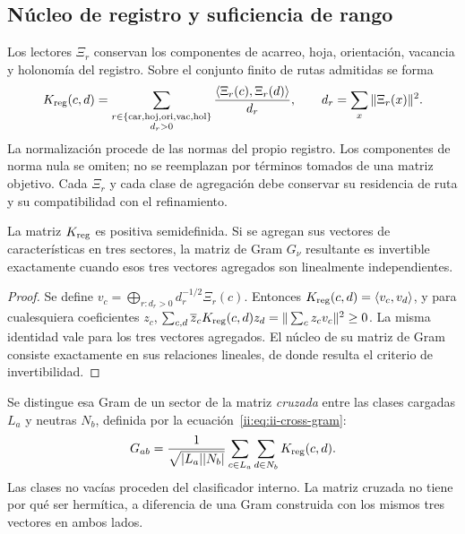 \subsection{Núcleo de registro y suficiencia de rango}

Los lectores \(\Xi_r\) conservan los componentes de acarreo, hoja,
orientación, vacancia y holonomía del registro. Sobre el conjunto finito
de rutas admitidas se forma
\begin{equation}
 K_{\rm reg}(c,d)=
 \sum_{\substack{r\in\{\mathrm{car},\mathrm{hoj},\mathrm{ori},
                           \mathrm{vac},\mathrm{hol}\}\\ d_r>0}}
 \frac{\langle\Xi_r(c),\Xi_r(d)\rangle}{d_r},
 \qquad
 d_r=\sum_x\|\Xi_r(x)\|^2.
 \label{ii:eq:ii-reg-kernel}
\end{equation}
La normalización procede de las normas del propio registro. Los
componentes de norma nula se omiten; no se reemplazan por términos tomados
de una matriz objetivo. Cada \(\Xi_r\) y cada clase de agregación debe
conservar su residencia de ruta y su compatibilidad con el refinamiento.

\begin{proposition}
La matriz \(K_{\rm reg}\) es positiva semidefinida. Si se agregan sus
vectores de características en tres sectores, la matriz de Gram
\(G_\nu\) resultante es invertible exactamente cuando esos tres vectores
agregados son linealmente independientes.
\end{proposition}

\begin{proof}
Se define
\(v_c=\bigoplus_{r:d_r>0}d_r^{-1/2}\Xi_r(c)\).
Entonces \(K_{\rm reg}(c,d)=\langle v_c,v_d\rangle\), y para
cualesquiera coeficientes \(z_c\),
\(\sum_{c,d}\overline z_cK_{\rm reg}(c,d)z_d
=\|\sum_c z_cv_c\|^2\ge0\).
La misma identidad vale para los tres vectores agregados.
El núcleo de su matriz de Gram consiste exactamente en sus relaciones
lineales, de donde resulta el criterio de invertibilidad.
\end{proof}

Se distingue esa Gram de un sector de la matriz \emph{cruzada} entre las
clases cargadas \(L_a\) y neutras \(N_b\), definida por la ecuación~\eqref{ii:eq:ii-cross-gram}:
\begin{equation}
 G_{ab}=\frac1{\sqrt{|L_a||N_b|}}
       \sum_{c\in L_a}\sum_{d\in N_b}K_{\rm reg}(c,d).
 \label{ii:eq:ii-cross-gram}
\end{equation}
Las clases no vacías proceden del clasificador interno. La matriz cruzada
no tiene por qué ser hermítica, a diferencia de una Gram construida con
los mismos tres vectores en ambos lados.

